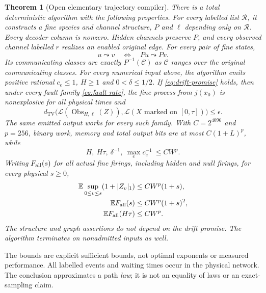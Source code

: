 \documentclass[11pt,reqno]{amsart}
\newtheorem{theorem}{Theorem}[section]
\theoremstyle{definition}
\theoremstyle{remark}
\newcommand{\E}{\mathbb E}
\newcommand{\TV}{d_{\mathrm{TV}}}
\newcommand{\Law}{\mathcal L}
\DeclareMathOperator{\Obs}{Obs}
\begin{document}
\newpage
\begin{theorem}[Open elementary trajectory compiler]\label{thm:open}
There is a total deterministic algorithm with the following properties.
For every labelled list $\mathcal R$, it constructs a fine species and channel
structure, $P$ and $\ell$ depending only on $\mathcal R$. Every decoder column
is nonzero. Hidden channels preserve $P$, and every observed channel labelled
$r$ realizes an enabled original edge. For every pair of fine states,
\begin{equation}\label{eq:graph-theorem}
 u\leadsto v\quad\Longleftrightarrow\quad Pu\leadsto Pv.
\end{equation}
Its communicating classes are exactly $P^{-1}(\mathcal C)$ as $\mathcal C$
ranges over the original communicating classes.
For every numerical input above, the algorithm emits positive rational
$c_e\le1$, $H\ge1$ and $0<\delta\le1/2$. If
\eqref{eq:drift-promise} holds, then under \emph{every} fault family
\eqref{eq:fault-rate}, the fine process from $j(x_0)$ is nonexplosive for all
physical times and
\begin{equation}\label{eq:main-TV}
 \TV\bigl(\Law(\Obs_{H,\ell}(Z)),\Law(X\text{ marked on }[0,\tau])\bigr)
 \le\epsilon.
\end{equation}
The same emitted output works for every such family. With
$C=2^{4096}$ and $p=256$, binary work, memory and total output bits are at most
$C(1+L)^p$, while
\begin{equation}\label{eq:main-numeric}
 H,\ H\tau,\ \delta^{-1},\ \max_e c_e^{-1}\ \le C W^p.
\end{equation}
Writing $F_{\rm all}(s)$ for all actual fine firings, including hidden and null
firings, for every physical $s\ge0$,
\begin{align}
 \E\sup_{0\le v\le s}(1+|Z_v|_1)&\le CW^p(1+s),\label{eq:main-pop}\\
 \E F_{\rm all}(s)&\le CW^p(1+s)^2,\label{eq:main-firing}\\
 \E F_{\rm all}(H\tau)&\le CW^p.\label{eq:main-horizon}
\end{align}
The structure and graph assertions do not depend on the drift promise.
The algorithm terminates on nonadmitted inputs as well.
\end{theorem}

The bounds are explicit sufficient bounds, not optimal exponents or measured
performance. All labelled events and waiting times occur in the physical
network. The conclusion approximates a path \emph{law}; it is not an equality of
laws or an exact-sampling claim.
\end{document}
